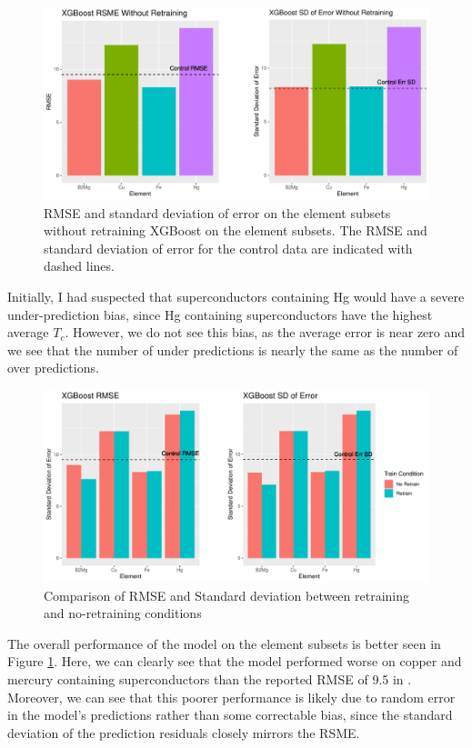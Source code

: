 \documentclass[oneside,12pt]{amsart}
\begin{document}
 \begin{figure}[ht]
     \centering
     \includegraphics[width=\linewidth]{../Plots/Element_ntr_brplt.pdf}
     \caption{RMSE and standard deviation of error on the element subsets without retraining XGBoost on the element subsets. The RMSE and standard deviation of error for the control data are indicated with dashed lines.}
     \label{fig:elemental_nrt_comparsion}
 \end{figure}
 
Initially, I had suspected that superconductors containing Hg would have a severe under-prediction bias, since Hg containing superconductors have the highest average $T_c$. However, we do not see this bias, as the average error is near zero and we see that the number of under predictions is nearly the same as the number of over predictions.


  \begin{figure}[ht]
     \centering
     \includegraphics[width=\linewidth]{../Plots/Element_comparison_bxplt.pdf}
     \caption{Comparison of RMSE and Standard deviation between retraining and no-retraining conditions}
     \label{fig:elemental_rt_brplt}
 \end{figure}
 

The overall performance of the model on the element subsets is better seen in Figure \ref{fig:elemental_nrt_comparsion}. Here, we can clearly see that the model performed worse on copper and mercury containing superconductors than the reported RMSE of 9.5 in \cite{hamidieh_data-driven_2018}. Moreover, we can see that this poorer performance is likely due to random error in the model's predictions rather than some correctable bias, since the standard deviation of the prediction residuals closely mirrors the RSME.
\end{document}
